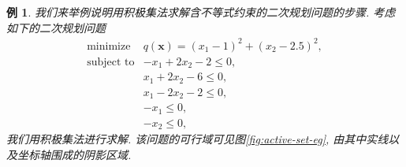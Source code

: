 \documentclass{SBCbookchapter}
\newcommand{\V}[1]{{\bm{#1}}}
\newtheorem{eg}[thm]{例}
\numberwithin{equation}{section}
\begin{document}
\begin{eg}
\label{eg:qp-active-set-algo}
我们来举例说明用积极集法求解含不等式约束的二次规划问题的步骤. 考虑如下的二次规划问题
\begin{equation*}
\begin{array}{cl}
\text{minimize} & q(\V{x}) = (x_1 - 1)^2 + (x_2 - 2.5)^2, \\
\text{subject to} & -x_1 + 2x_2 - 2 \leqslant 0, \\
& x_1 + 2x_2 - 6 \leqslant 0, \\
& x_1 - 2x_2 - 2 \leqslant 0, \\
& -x_1 \leqslant 0, \\
& -x_2 \leqslant 0,
\end{array}
\end{equation*}
我们用积极集法进行求解. 该问题的可行域可见图\ref{fig:active-set-eg}, 由其中实线以及坐标轴围成的阴影区域.

\newif\ifsteparrows
\steparrowsfalse


\end{eg}
\end{document}
